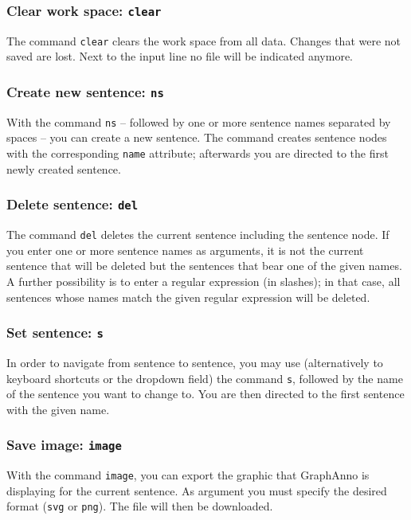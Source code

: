 \documentclass[12pt]{scrartcl}
\begin{document}
\subsubsection{Clear work space: \texttt{clear}}

The command \texttt{clear} clears the work space from all data.
Changes that were not saved are lost.
Next to the input line no file will be indicated anymore.


\subsubsection{Create new sentence: \texttt{ns}}\label{befehl-ns}

With the command \texttt{ns} – followed by one or more sentence names separated by spaces – you can create a new sentence.
The command creates sentence nodes with the corresponding \texttt{name} attribute; afterwards you are directed to the first newly created sentence.


\subsubsection{Delete sentence: \texttt{del}}

The command \texttt{del} deletes the current sentence including the sentence node.
If you enter one or more sentence names as arguments, it is not the current sentence that will be deleted but the sentences that bear one of the given names.
A further possibility is to enter a regular expression (in slashes); in that case, all sentences whose names match the given regular expression will be deleted.


\subsubsection{Set sentence: \texttt{s}}

In order to navigate from sentence to sentence, you may use (alternatively to keyboard shortcuts or the dropdown field) the command \texttt{s}, followed by the name of the sentence you want to change to.
You are then directed to the first sentence with the given name.


\subsubsection{Save image: \texttt{image}}

With the command \texttt{image}, you can export the graphic that GraphAnno is displaying for the current sentence.
As argument you must specify the desired format (\texttt{svg} or \texttt{png}).
The file will then be downloaded.
\end{document}
